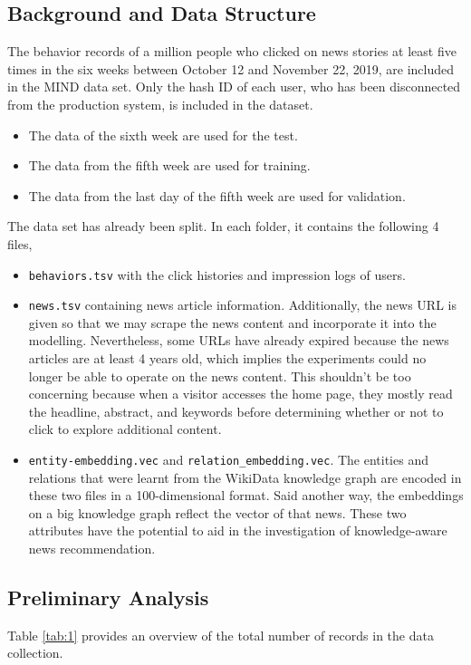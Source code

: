 \documentclass[9pt,twocolumn,twoside,lineno]{gsajnl}
\begin{document}
\subsection{Background and Data Structure}
The behavior records of a million people who clicked on news stories at least five times in the six weeks between October 12 and November 22, 2019, are included in the MIND data set. Only the hash ID of each user, who has been disconnected from the production system, is included in the dataset.
\begin{itemize}[noitemsep]
  \item The data of the sixth week are used for the test.
  \item The data from the fifth week are used for training.
  \item The data from the last day of the fifth week are used for validation.
\end{itemize}
The data set has already been split. In each folder, it contains the following 4 ﬁles,
\begin{itemize}[noitemsep]
  \item \texttt{behaviors.tsv} with the click histories and impression logs of users.
  \item \texttt{news.tsv} containing news article information. Additionally, the news URL is given so that we may scrape the news content and incorporate it into the modelling. Nevertheless, some URLs have already expired because the news articles are at least 4 years old, which implies the experiments could no longer be able to operate on the news content. This shouldn't be too concerning because when a visitor accesses the home page, they mostly read the headline, abstract, and keywords before determining whether or not to click to explore additional content.
  \item \texttt{entity-embedding.vec} and \texttt{relation\_embedding.vec}. The entities and relations that were learnt from the WikiData knowledge graph are encoded in these two files in a 100-dimensional format. Said another way, the embeddings on a big knowledge graph reflect the vector of that news. These two attributes have the potential to aid in the investigation of knowledge-aware news recommendation.
\end{itemize}

\subsection{Preliminary Analysis}
Table \ref{tab:1} provides an overview of the total number of records in the data collection.
\end{document}
